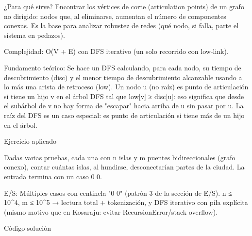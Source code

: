 ¿Para qué sirve? Encontrar los vértices de corte (articulation points) de un grafo no dirigido: nodos que, al eliminarse, aumentan el número de componentes conexas. Es la base para analizar robustez de redes (qué nodo, si falla, parte el sistema en pedazos).

Complejidad: O(V + E) con DFS iterativo (un solo recorrido con low-link).

Fundamento teórico: Se hace un DFS calculando, para cada nodo, su tiempo de descubrimiento (disc) y el menor tiempo de descubrimiento alcanzable usando a lo más una arista de retroceso (low). Un nodo u (no raíz) es punto de articulación si tiene un hijo v en el árbol DFS tal que low[v] ≥ disc[u]: eso significa que desde el subárbol de v no hay forma de "escapar" hacia arriba de u sin pasar por u. La raíz del DFS es un caso especial: es punto de articulación si tiene más de un hijo en el árbol.

Ejercicio aplicado

Dadas varias pruebas, cada una con n islas y m puentes bidireccionales (grafo conexo), contar cuántas islas, al hundirse, desconectarían partes de la ciudad. La entrada termina con un caso 0 0.

E/S: Múltiples casos con centinela "0 0" (patrón 3 de la sección de E/S). n ≤ 10\textasciicircum{}4, m ≤ 10\textasciicircum{}5 → lectura total + tokenización, y DFS iterativo con pila explícita (mismo motivo que en Kosaraju: evitar RecursionError/stack overflow).

Código solución

